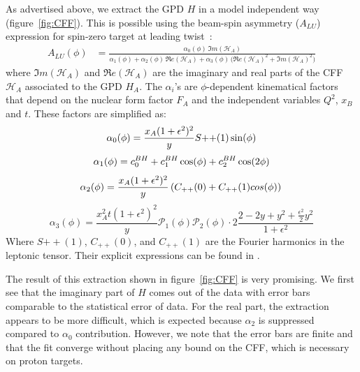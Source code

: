 \documentclass[%
 reprint,
 amsmath,amssymb,
 aps,
]{revtex4-1}
\begin{document}
As advertised above, 
we extract the GPD $H$ in a model independent way (figure~\ref{fig:CFF}). This 
is possible using the beam-spin asymmetry ($A_{LU}$) expression for spin-zero 
target at leading twist~\cite{BM_2009}:
\begin{equation}
\begin{split}
A_{LU}(\phi) &= \frac{\alpha_{0}(\phi) \, \Im m(\mathcal{H}_{A})}
{\alpha_{1}(\phi) + \alpha_{2}(\phi) \, \Re e(\mathcal{H}_{A}) + \alpha_{3}(\phi) \, 
\big( 
\Re e(\mathcal{H}_{A})^{2} + \Im m(\mathcal{H}_{A})^{2} \big)}
\label{eq:A_LU-coh}
\end{split}
\end{equation}
where $\Im m(\mathcal{H}_{A})$ and $\Re e(\mathcal{H}_{A})$ are the imaginary 
and real parts of the CFF $\mathcal{H}_{A}$ associated to the GPD $H_A$. The 
$\alpha_{i}$'s are $\phi$-dependent kinematical factors that depend on the 
nuclear form factor $F_A$ and the independent variables $Q^2$, $x_{B}$ and $t$.  
These factors are simplified as:
\begin{equation}
   \alpha_0 (\phi) =\frac{x_{A}(1+\epsilon^2)^2}{y} S{++}(1) \sin(\phi)\\
\end{equation}
\begin{equation}
    \alpha_1 (\phi) = c_0^{BH}+c_1^{BH} \cos({\phi})+c_2^{BH} \cos(2\phi)\\ 
\end{equation}
\begin{equation}
   \alpha_2 (\phi) = \frac{x_{A}(1+\epsilon^2)^2}{y}  \left( C_{++}(0) +  
C_{++}(1) cos(\phi) \right)\\
\end{equation}
\begin{equation}
\alpha_3 (\phi) = \frac{x^{2}_{A}t(1+\epsilon^2)^2}{y} {\mathcal P}_1(\phi) 
{\mathcal P}_2(\phi) \cdot 2 \frac{2-2y+y^2 + \frac{\epsilon^2}{2}y^2}{1 + 
\epsilon^2}
\end{equation}
Where $S{++}(1)$, $C_{++}(0)$, and $C_{++}(1)$ are the Fourier harmonics in the 
leptonic tensor. Their explicit expressions can be found in \cite{}.  

The result of this extraction shown in figure~\ref{fig:CFF} is very promising.
We first see that the imaginary part of $H$ comes out of the data with 
error bars comparable to the statistical error of data. For the real part,
the extraction appears to be more difficult, which is expected because 
$\alpha_2$ is suppressed compared to $\alpha_0$ contribution. However,
we note that the error bars are finite and that the fit converge without 
placing any bound on the CFF, which is necessary on proton targets.
\end{document}
